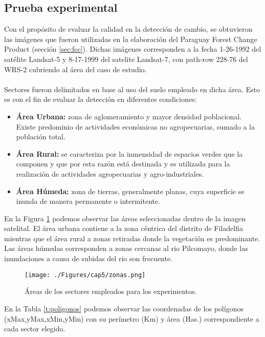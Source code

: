 \subsection{Prueba experimental} 
Con el prop\'osito de evaluar la calidad en la detecci\'on de cambio, se obtuvieron las im\'agenes que fueron utilizadas en la elaboraci\'on del Paraguay Forest Change Product (secci\'on \ref{sec:fcc}). Dichas im\'agenes corresponden a la fecha 1-26-1992	del sat\'elite Landsat-5 y 8-17-1999 del satelite Landsat-7, con path-row 228-76 del WRS-2 cubriendo al \'area del caso de estudio.\\~\\
Sectores fueron delimitados en base al uso del suelo empleado en dicha \'area. Esto es con el fin de evaluar la detecci\'on en diferentes condiciones:
\begin{itemize}
	\item \textbf{\'Area Urbana:} zona de aglomeramiento y mayor densidad poblacional. Existe predominio  de actividades econ\'omicas no agropecuarias, sumado a la poblaci\'on total. 
	\item \textbf{\'Area Rural:} se caracteriza por la inmensidad de espacios verdes que la componen y que por esta raz\'on est\'a destinada y es utilizada para la realizaci\'on de actividades agropecuarias y agro-industriales.
	\item \textbf{\'Area H\'umeda:}	zona de tierras, generalmente planas, cuya superficie se inunda de manera permanente o intermitente.
\end{itemize}
En la Figura \ref{fig:zonasEva} podemos observar las \'areas seleccionadas dentro de la imagen satelital. El \'area urbana contiene a la zona c\'entrica del distrito de Filadelfia mientras que el \'area rural a zonas retiradas donde la vegetaci\'on es predominante. Las \'areas h\'umedas corresponden a zonas cercanas al rio Pilcomayo, donde las inundaciones a causa de subidas del rio son frecuente.   
\begin{figure}[H]
	\centering
	\texttt{[image: ./Figures/cap5/zonas.png]}
	\caption{\'Areas de los sectores empleados para los experimentos.}
	\label{fig:zonasEva}
\end{figure}
En la Tabla \ref{t:poligonos} podemos observar las coordenadas de los pol\'igonos (xMax,yMax,xMin,yMin) con su per\'imetro (Km) y \'area (Has.) correspondiente a cada sector elegido.
